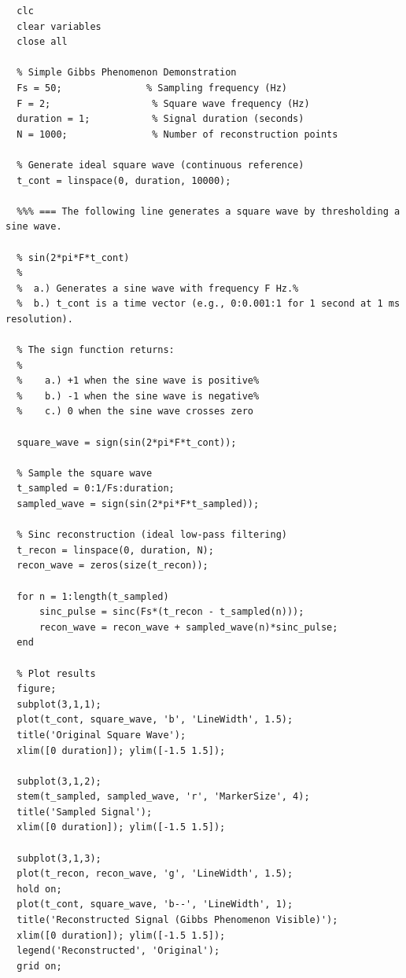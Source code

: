 \documentclass[12pt]{report}
\begin{document}
  \begin{lstlisting}
  clc
  clear variables 
  close all

  % Simple Gibbs Phenomenon Demonstration
  Fs = 50;               % Sampling frequency (Hz)
  F = 2;                  % Square wave frequency (Hz)
  duration = 1;           % Signal duration (seconds)
  N = 1000;               % Number of reconstruction points

  % Generate ideal square wave (continuous reference)
  t_cont = linspace(0, duration, 10000);

  %%% === The following line generates a square wave by thresholding a sine wave. 

  % sin(2*pi*F*t_cont)
  % 
  %  a.) Generates a sine wave with frequency F Hz.% 
  %  b.) t_cont is a time vector (e.g., 0:0.001:1 for 1 second at 1 ms resolution).

  % The sign function returns:
  % 
  %    a.) +1 when the sine wave is positive% 
  %    b.) -1 when the sine wave is negative% 
  %    c.) 0 when the sine wave crosses zero

  square_wave = sign(sin(2*pi*F*t_cont));

  % Sample the square wave
  t_sampled = 0:1/Fs:duration;
  sampled_wave = sign(sin(2*pi*F*t_sampled));

  % Sinc reconstruction (ideal low-pass filtering)
  t_recon = linspace(0, duration, N);
  recon_wave = zeros(size(t_recon));

  for n = 1:length(t_sampled)
      sinc_pulse = sinc(Fs*(t_recon - t_sampled(n)));
      recon_wave = recon_wave + sampled_wave(n)*sinc_pulse;
  end

  % Plot results
  figure;
  subplot(3,1,1);
  plot(t_cont, square_wave, 'b', 'LineWidth', 1.5);
  title('Original Square Wave');
  xlim([0 duration]); ylim([-1.5 1.5]);

  subplot(3,1,2);
  stem(t_sampled, sampled_wave, 'r', 'MarkerSize', 4);
  title('Sampled Signal');
  xlim([0 duration]); ylim([-1.5 1.5]);

  subplot(3,1,3);
  plot(t_recon, recon_wave, 'g', 'LineWidth', 1.5);
  hold on;
  plot(t_cont, square_wave, 'b--', 'LineWidth', 1);
  title('Reconstructed Signal (Gibbs Phenomenon Visible)');
  xlim([0 duration]); ylim([-1.5 1.5]);
  legend('Reconstructed', 'Original');
  grid on;
  \end{lstlisting}

  \vspace{0.5in}
\end{document}
